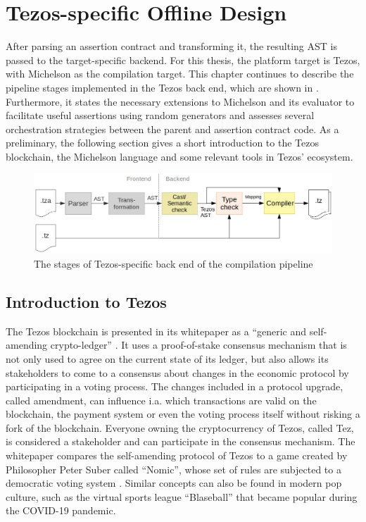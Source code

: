 \chapter{Tezos-specific Offline Design}\label{chap:offline_tezos}
After parsing an assertion contract and transforming it, the resulting AST is passed to the target-specific backend. For this thesis, the platform target is Tezos, with Michelson as the compilation target. This chapter continues to describe the pipeline stages implemented in the Tezos back end, which are shown in . Furthermore, it states the necessary extensions to Michelson and its evaluator to facilitate useful assertions using random generators and assesses several orchestration strategies between the parent and assertion contract code. As a preliminary, the following section gives a short introduction to the Tezos blockchain, the Michelson language and some relevant tools in Tezos' ecosystem.
\begin{figure}[h]
\includegraphics[width=\linewidth]{figures/4-offline_tezos/pipeline_backend}
\caption{The stages of Tezos-specific back end of the compilation pipeline}
\label{fig:pipeline_backend}
\end{figure}

\section{Introduction to Tezos}\label{sec:tezos}
The Tezos blockchain is presented in its whitepaper as a \enquote{generic and self-amending crypto-ledger} \cite{goodman_tezos_2014}. It uses a proof-of-stake consensus mechanism that is not only used to agree on the current state of its ledger, but also allows its stakeholders to come to a consensus about changes in the economic protocol by participating in a voting process. The changes included in a protocol upgrade, called amendment, can influence i.a. which transactions are valid on the blockchain, the payment system or even the voting process itself without risking a fork of the blockchain. Everyone owning the cryptocurrency of Tezos, called Tez, is considered a stakeholder and can participate in the consensus mechanism. The whitepaper compares the self-amending protocol of Tezos to a game created by Philosopher Peter Suber called ``Nomic'', whose set of rules are subjected to a democratic voting system \cite{nomic}. Similar concepts can also be found in modern pop culture, such as the virtual sports league ``Blaseball'' \cite{blaseball} that became popular during the COVID-19 pandemic.

